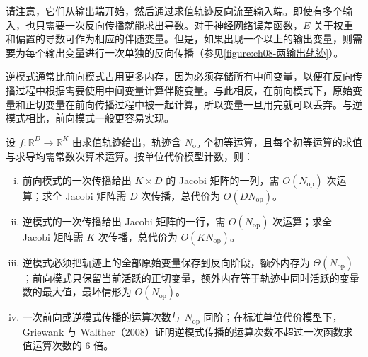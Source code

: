 \documentclass[../../main.tex]{subfiles}
\begin{document}
请注意，它们从输出端开始，然后通过求值轨迹反向流至输入端。即使有多个输入，也只需要一次反向传播就能求出导数。对于神经网络误差函数，$E$ 关于权重和偏置的导数可作为相应的伴随变量。但是，如果出现一个以上的输出变量，则需要为每个输出变量进行一次单独的反向传播（参见\cref{figure:ch08-两输出轨迹}）。

逆模式通常比前向模式占用更多内存，因为必须存储所有中间变量，以便在反向传播过程中根据需要使用中间变量计算伴随变量。与此相反，在前向模式下，原始变量和正切变量在前向传播过程中被一起计算，所以变量一旦用完就可以丢弃。与逆模式相比，前向模式一般更容易实现。

\begin{proposition}[前向模式与逆模式的代价比较]\label{proposition:ch08-模式代价}
设 $f:\mathbb{R}^{D}\to\mathbb{R}^{K}$ 由求值轨迹给出，轨迹含 $N_{\mathrm{op}}$ 个初等运算，且每个初等运算的求值与求导均需常数次算术运算。按单位代价模型计数，则：
\begin{enumerate}[(i)]
\item\label{item:ch08-前向代价}前向模式的一次传播给出 $K\times D$ 的 Jacobi 矩阵的一列，需 $O(N_{\mathrm{op}})$ 次运算；求全 Jacobi 矩阵需 $D$ 次传播，总代价为 $O(DN_{\mathrm{op}})$。
\item\label{item:ch08-逆代价}逆模式的一次传播给出 Jacobi 矩阵的一行，需 $O(N_{\mathrm{op}})$ 次运算；求全 Jacobi 矩阵需 $K$ 次传播，总代价为 $O(KN_{\mathrm{op}})$。
\item\label{item:ch08-内存代价}逆模式必须把轨迹上的全部原始变量保存到反向阶段，额外内存为 $\Theta(N_{\mathrm{op}})$；前向模式只保留当前活跃的正切变量，额外内存等于轨迹中同时活跃的变量数的最大值，最坏情形为 $O(N_{\mathrm{op}})$。
\item\label{item:ch08-常数因子}一次前向或逆模式传播的运算次数与 $N_{\mathrm{op}}$ 同阶；在标准单位代价模型下，Griewank 与 Walther（2008）证明逆模式传播的运算次数不超过一次函数求值运算次数的 $6$ 倍。
\end{enumerate}
\end{proposition}
\end{document}
